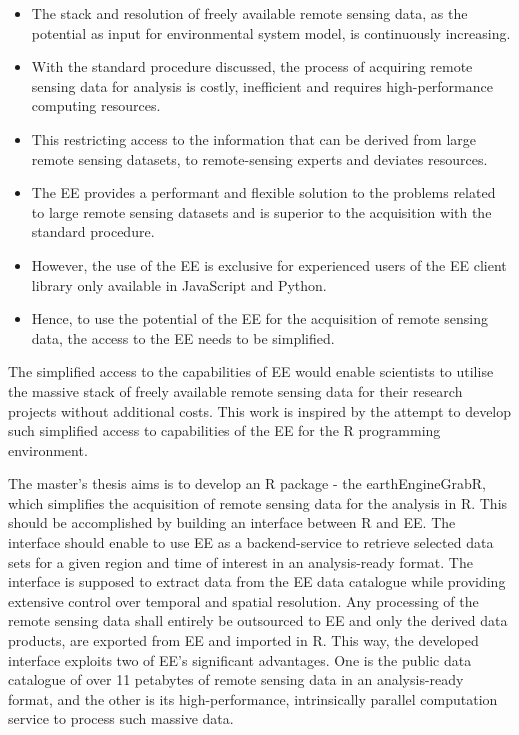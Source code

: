 \begin{itemize}
	
	\item The stack and resolution of freely available remote sensing data, as the potential as input for environmental system model, is continuously increasing.
	\item With the standard procedure discussed, the process of acquiring remote sensing data for analysis is costly, inefficient and requires high-performance computing resources.
	\item This restricting access to the information that can be derived from large remote sensing datasets, to remote-sensing experts and deviates resources.
	\item The EE provides a performant and flexible solution to the problems related to large remote sensing datasets and is superior to the acquisition with the standard procedure.
	\item However, the use of the EE is exclusive for experienced users of the EE client library only available in JavaScript and Python.
	\item Hence, to use the potential of the EE for the acquisition of remote sensing data, the access to the EE needs to be simplified.
	
\end{itemize}

The simplified access to the capabilities of EE would enable scientists to utilise the massive stack of freely available remote sensing data for their research projects without additional costs. This work is inspired by the attempt to develop such simplified access to capabilities of the EE for the R programming environment.

The master's thesis aims is to develop an R package - the earthEngineGrabR, which simplifies the acquisition of remote sensing data for the analysis in R. This should be accomplished by building an interface between R and EE.
The interface should enable to use EE as a backend-service to retrieve selected data sets for a given region and time of interest in an analysis-ready format. The interface is supposed to extract data from the EE data catalogue while providing extensive control over temporal and spatial resolution. 
Any processing of the remote sensing data shall entirely be outsourced to EE and only the derived data products, are exported from EE and imported in R. This way, the developed interface exploits two of EE's significant advantages. One is the public data catalogue of over 11 petabytes of remote sensing data in an analysis-ready format, and the other is its high-performance, intrinsically parallel computation service to process such massive data.


